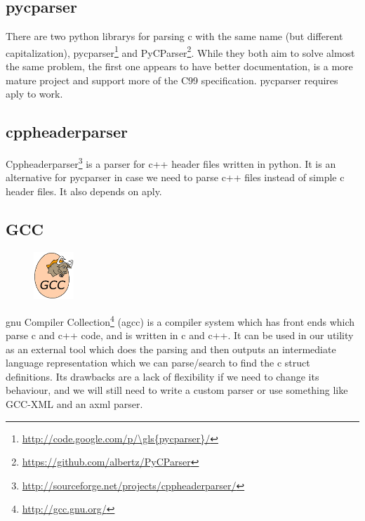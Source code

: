 \subsection{\gls{pycparser}}
\label{sec:pre:pycparser}
There are two \Gls{python} \glspl{library} for parsing \Gls{c} with the same name (but different
capitalization), \gls{pycparser}\footnote{\url{http://code.google.com/p/\gls{pycparser}/}}
and PyCParser\footnote{\url{https://github.com/albertz/PyCParser}}. While they
both aim to solve almost the same problem, the first one appears to have better
documentation, is a more mature project and support more of the \Gls{C99}
specification. \gls{pycparser} requires \Gls{aply} to work.

\subsection{cppheaderparser}
Cppheaderparser\footnote{\url{http://sourceforge.net/projects/cppheaderparser/}}
is a \gls{parser} for \Gls{c++} \gls{header} files written in \Gls{python}. It is an alternative for
\gls{pycparser} in case we need to parse \Gls{c++} files instead of simple \Gls{c} \gls{header} files.
It also depends on \Gls{aply}.

\subsection{GCC}
\label{sec:pre:gcc}
\begin{figure}
	\vspace{-20pt}
	\includegraphics[width=1.5cm]{./planning/img/gcc_logo}
	\vspace{-20pt}
\end{figure}
\gls{gnu} Compiler Collection\footnote{\url{http://gcc.gnu.org/}} (\Gls{agcc}) is a
compiler system which has front ends which parse \Gls{c} and \Gls{c++} code, and is written
in \Gls{c} and \Gls{c++}. It can be used in our \gls{utility} as an external tool which does the
parsing and then outputs an intermediate language representation which we can
parse/search to find the \Gls{c} \gls{struct} definitions. Its drawbacks are a lack of
flexibility if we need to change its behaviour, and we will still need to write
a custom \gls{parser} or use something like \gls{GCC-XML} and an \gls{axml} \gls{parser}.

